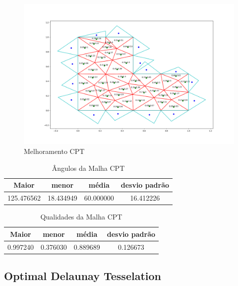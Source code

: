 \begin{figure}[ht]
    \centering
    \includegraphics[width=1\linewidth]{fig/malha-cpt.png}
    \caption{Melhoramento CPT}
    \label{fig:malha-cpt}
\end{figure}

\begin{table}[hb]
\centering
\par\caption{Ângulos da Malha CPT}
\begin{tabular}{c|c|c|c}
Maior&menor&média&desvio padrão\\\hline\hline
125.476562&18.434949&60.000000&16.412226\\\hline
\end{tabular}
\label{tab:angulos-malha-cpt}
\end{table}

\begin{table}[hb]
\centering
\par\caption{Qualidades da Malha CPT}
\begin{tabular}{c|c|c|c}
Maior&menor&média&desvio padrão\\\hline\hline
0.997240&0.376030&0.889689&0.126673\\\hline
\end{tabular}
\label{tab:qualidades-malha-cpt}
\end{table}

\newpage
\subsection{Optimal Delaunay Tesselation}

